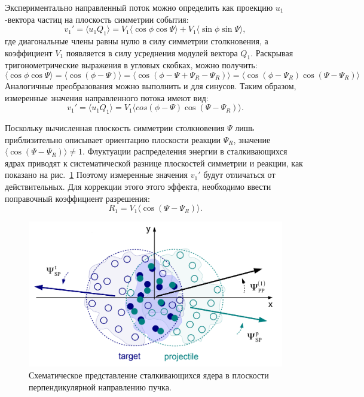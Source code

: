 Экспериментально направленный поток можно определить как проекцию $u_1$-вектора частиц на плоскость симметрии события:
%
\begin{equation}
    v_1' =  \langle u_1 Q_1 \rangle = 
    V_1 \langle \cos\phi \cos \Psi \rangle + V_1 \langle \sin\phi \sin\Psi \rangle,
\end{equation}
%
где диагональные члены равны нулю в силу симметрии столкновения, а коэффициент $V_1$ появляется в силу усреднения модулей вектора $Q_1$.
Раскрывая тригонометрические выражения в угловых скобках, можно получить:
%
\begin{equation}
    \langle \cos\phi \cos \Psi \rangle = \langle \cos( \phi - \Psi ) \rangle = 
    \langle \cos( \phi - \Psi + \Psi_R - \Psi_R ) \rangle =
    \langle \cos( \phi - \Psi_R ) \cos(\Psi - \Psi_R ) \rangle
\end{equation}
%
Аналогичные преобразования можно выполнить и для синусов. 
Таким образом, измеренные значения направленного потока имеют вид:
%
\begin{equation}
    v_1' =  \langle u_1 Q_1 \rangle = 
    V_1 \langle cos( \phi - \Psi ) \cos(\Psi - \Psi_R) \rangle.
    \label{eq:uq_transformation}
\end{equation}
%

Поскольку вычисленная плоскость симметрии столкновения $\Psi$ лишь приблизительно описывает ориентацию плоскости реакции $\Psi_R$, значение $ \langle \cos(\Psi - \Psi_R) \rangle \ne 1 $.
Флуктуации распределения энергии в сталкивающихся ядрах приводят к систематической разнице плоскостей симметрии и реакции, как показано на рис.~\ref{fig:pp_sp_rp}
Поэтому измеренные значения $v_1'$ будут отличаться от действительных.
Для коррекции этого этого эффекта, необходимо ввести поправочный коэффициент разрешения:
%
\begin{equation}
    R_1 = V_1 \langle \cos(\Psi - \Psi_R) \rangle.
\end{equation}
%

%
\begin{figure}[ht]
\begin{center}
\includegraphics[width=0.75\linewidth]{images/v1_pp_sp.png}
\caption{Схематическое представление сталкивающихся ядера в плоскости перпендикулярной направлению пучка.}
\label{fig:pp_sp_rp}
\end{center}
\end{figure}
%

